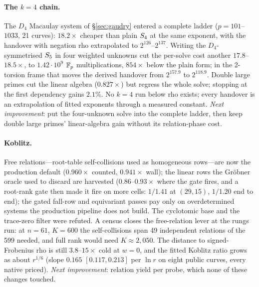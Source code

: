 \paragraph{The $k=4$ chain.} The $D_4$ Macaulay system of
\S\ref{sec:gaudry} entered a complete ladder ($p=101$--$1033$, 21 curves):
$18.2\times$ cheaper than plain $S_{4}$ at the same exponent, with the
handover with negation rho extrapolated to $2^{126}$--$2^{137}$. Writing
the $D_4$-symmetrised $S_{5}$ in four weighted unknowns cut the per-solve
cost another $17.8$--$18.5\times$, to $1.42\cdot10^9$ $\mathbb{F}_p$
multiplications, $854\times$ below the plain form; in the 2-torsion frame
that moves the derived handover from $2^{157.9}$ to $2^{118.9}$. Double
large primes cut the linear algebra ($0.827\times$) but regress the whole
solve; stopping at the first dependency gains $2.1\%$. No $k=4$ run below
rho exists; every handover is an extrapolation of fitted exponents through
a measured constant. \emph{Next improvement}: put the four-unknown solve
into the complete ladder, then keep double large primes' linear-algebra
gain without its relation-phase cost.

\paragraph{Koblitz.} Free relations---root-table self-collisions used as
homogeneous rows---are now the production default ($0.960\times$ counted,
$0.941\times$ wall); the linear rows the Gr\"obner oracle used to discard
are harvested ($0.86$--$0.93\times$ where the gate fires, and a root-rank
gate then made it fire on more cells: $1/1.41$ at $(29,15)$, $1/1.20$ end
to end); the gated
fall-row and equivariant passes pay only on overdetermined systems the
production pipeline does not build. The cyclotomic base and the trace-zero
filter were refuted. A census closes the free-relation lever at the rungs
run: at $n=61$, $K=600$ the self-collisions span 49 independent relations of
the 599 needed, and full rank would need $K\approx2{,}050$. The distance to
signed-Frobenius rho is still $3.8$--$15\times$ cold at $w=0$, and the
fitted Koblitz ratio grows as about $r^{1/6}$ (slope $0.165$ $[0.117,0.213]$
per $\ln r$ on eight public curves, every native priced).
\emph{Next improvement}: relation yield per probe, which none of these
changes touched.

